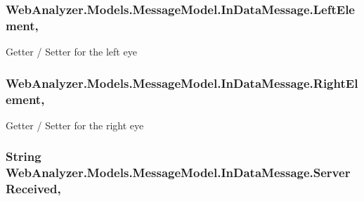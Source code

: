 \subsubsection[{Left\+Element}]{ Web\+Analyzer.\+Models.\+Message\+Model.\+In\+Data\+Message.\+Left\+Element\hspace{0.3cm}{\ttfamily [get]}, {\ttfamily [set]}}\label{class_web_analyzer_1_1_models_1_1_message_model_1_1_in_data_message_a7669353e9b42a3f58e3b17c00087eb21}


Getter / Setter for the left eye 

\hypertarget{class_web_analyzer_1_1_models_1_1_message_model_1_1_in_data_message_a8b8cd07f6ac3c4a5dd9a5d470b4a113c}{}
\subsubsection[{Right\+Element}]{ Web\+Analyzer.\+Models.\+Message\+Model.\+In\+Data\+Message.\+Right\+Element\hspace{0.3cm}{\ttfamily [get]}, {\ttfamily [set]}}\label{class_web_analyzer_1_1_models_1_1_message_model_1_1_in_data_message_a8b8cd07f6ac3c4a5dd9a5d470b4a113c}


Getter / Setter for the right eye 

\hypertarget{class_web_analyzer_1_1_models_1_1_message_model_1_1_in_data_message_ae6ff5467025cab4867de27d450d48c55}{}
\subsubsection[{Server\+Received}]{\setlength{\rightskip}{0pt plus 5cm}String Web\+Analyzer.\+Models.\+Message\+Model.\+In\+Data\+Message.\+Server\+Received\hspace{0.3cm}{\ttfamily [get]}, {\ttfamily [set]}}\label{class_web_analyzer_1_1_models_1_1_message_model_1_1_in_data_message_ae6ff5467025cab4867de27d450d48c55}


